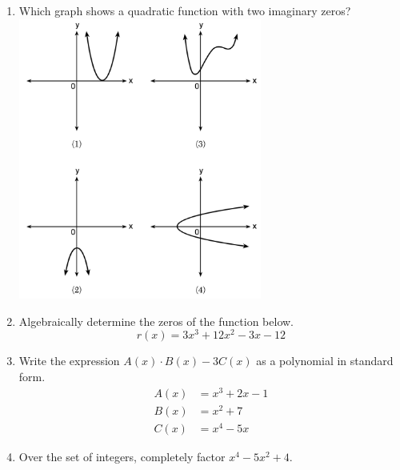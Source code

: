 \documentclass[12pt, twoside]{article}
\begin{document}
\begin{enumerate}[itemsep=0.5cm]
\item Which graph shows a quadratic function with two imaginary zeros? \\
\includegraphics*[width=8cm]{../graphics/regents-jan2023-24-polynomials.png}

\item Algebraically determine the zeros of the function below.
$$r(x) = 3x^3+12x^2-3x-12$$

\item Write the expression $A(x) \cdot B(x) - 3C(x)$ as a polynomial in standard form.
    \begin{align*}
        A(x) &= x^3 + 2x - 1 \\
        B(x) &= x^2 + 7 \\
        C(x) &= x^4 - 5x
    \end{align*}

\item Over the set of integers, completely factor $x^4-5x^2+4$.

\end{enumerate}
\end{document}
